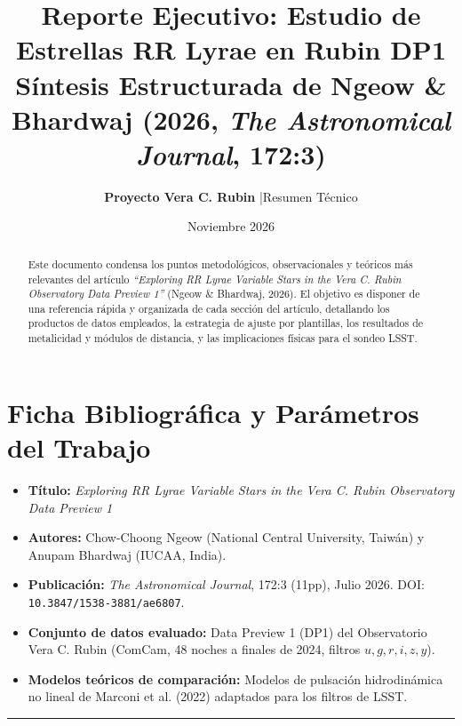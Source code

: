 \documentclass[11pt,a4paper]{article}
\title{\textbf{\Large Reporte Ejecutivo: Estudio de Estrellas RR Lyrae en Rubin DP1}\\
\large Síntesis Estructurada de Ngeow \& Bhardwaj (2026, \textit{The Astronomical Journal}, 172:3)}
\author{\textbf{Proyecto Vera C. Rubin} \quad|\quad Resumen Técnico}
\date{Noviembre 2026}
\begin{document}
\maketitle

\begin{abstract}
\noindent Este documento condensa los puntos metodológicos, observacionales y teóricos más relevantes del artículo \textit{“Exploring RR Lyrae Variable Stars in the Vera C. Rubin Observatory Data Preview 1”} (Ngeow \& Bhardwaj, 2026). El objetivo es disponer de una referencia rápida y organizada de cada sección del artículo, detallando los productos de datos empleados, la estrategia de ajuste por plantillas, los resultados de metalicidad y módulos de distancia, y las implicaciones físicas para el sondeo LSST.
\end{abstract}

\vspace{0.5em}

\section*{Ficha Bibliográfica y Parámetros del Trabajo}
\begin{itemize}
    \item \textbf{Título:} \textit{Exploring RR Lyrae Variable Stars in the Vera C. Rubin Observatory Data Preview 1}
    \item \textbf{Autores:} Chow-Choong Ngeow (National Central University, Taiwán) y Anupam Bhardwaj (IUCAA, India).
    \item \textbf{Publicación:} \textit{The Astronomical Journal}, 172:3 (11pp), Julio 2026. DOI: \texttt{10.3847/1538-3881/ae6807}.
    \item \textbf{Conjunto de datos evaluado:} Data Preview 1 (DP1) del Observatorio Vera C. Rubin (ComCam, 48 noches a finales de 2024, filtros $u, g, r, i, z, y$).
    \item \textbf{Modelos teóricos de comparación:} Modelos de pulsación hidrodinámica no lineal de Marconi et al. (2022) adaptados para los filtros de LSST.
\end{itemize}

\vspace{0.5em}
\hrule
\vspace{0.8em}
\end{document}
